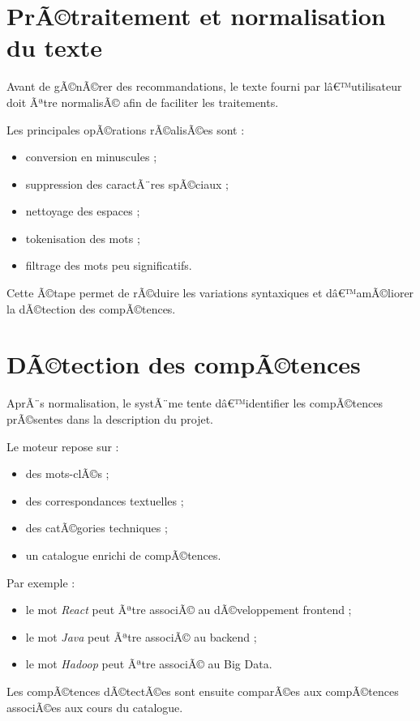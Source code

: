 ﻿\documentclass[12pt,a4paper]{report}
\begin{document}
\section{PrÃ©traitement et normalisation du texte}

Avant de gÃ©nÃ©rer des recommandations, le texte fourni par lâ€™utilisateur doit Ãªtre normalisÃ© afin de faciliter les traitements.

Les principales opÃ©rations rÃ©alisÃ©es sont :
\begin{itemize}
    \item conversion en minuscules ;
    \item suppression des caractÃ¨res spÃ©ciaux ;
    \item nettoyage des espaces ;
    \item tokenisation des mots ;
    \item filtrage des mots peu significatifs.
\end{itemize}

Cette Ã©tape permet de rÃ©duire les variations syntaxiques et dâ€™amÃ©liorer la dÃ©tection des compÃ©tences.

\section{DÃ©tection des compÃ©tences}

AprÃ¨s normalisation, le systÃ¨me tente dâ€™identifier les compÃ©tences prÃ©sentes dans la description du projet.

Le moteur repose sur :
\begin{itemize}
    \item des mots-clÃ©s ;
    \item des correspondances textuelles ;
    \item des catÃ©gories techniques ;
    \item un catalogue enrichi de compÃ©tences.
\end{itemize}

Par exemple :
\begin{itemize}
    \item le mot \textit{React} peut Ãªtre associÃ© au dÃ©veloppement frontend ;
    \item le mot \textit{Java} peut Ãªtre associÃ© au backend ;
    \item le mot \textit{Hadoop} peut Ãªtre associÃ© au Big Data.
\end{itemize}

Les compÃ©tences dÃ©tectÃ©es sont ensuite comparÃ©es aux compÃ©tences associÃ©es aux cours du catalogue.
\end{document}
